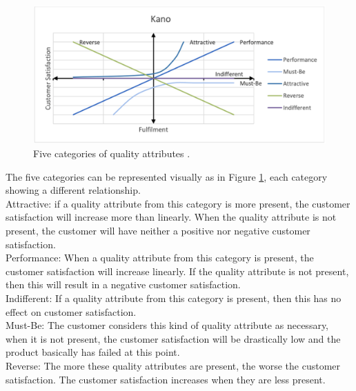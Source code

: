 \begin{figure}[ht]
	\includegraphics[scale=0.35]{../LaTeX/Figures/KANO.png}
	\caption{Five categories of quality attributes \citep{KANO1984}.}
	\label{fig:kano}
\end{figure}
\break
The five categories can be represented visually as in Figure \ref{fig:kano}, each category showing a different relationship.\\
\break
Attractive: if a quality attribute from this category is more present, the customer satisfaction will increase more than linearly. When the quality attribute is not present, the customer will have neither a positive nor negative customer satisfaction.\\
\break
Performance: When a quality attribute from this category is present, the customer satisfaction will increase linearly. If the quality attribute is not present, then this will result in a negative customer satisfaction.\\
\break
Indifferent: If a quality attribute from this category is present, then this has no effect on customer satisfaction.\\
\break
Must-Be: The customer considers this kind of quality attribute as necessary, when it is not present, the customer satisfaction will be drastically low and the product basically has failed at this point.\\
\break
Reverse: The more these quality attributes are present, the worse the customer satisfaction. The customer satisfaction increases when they are less present.\\

